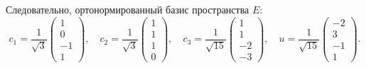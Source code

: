 Следовательно, ортонормированный базис пространства $E$:
{\hfuzz=5pt
\[
c_1=\frac1{\sqrt3}
\begin{pmatrix}
1\\
0\\
-1\\
1
\end{pmatrix},
\quad
c_2=\frac1{\sqrt3}
\begin{pmatrix}
1\\
1\\
1\\
0
\end{pmatrix},
\quad
c_3=\frac1{\sqrt{15}}
\begin{pmatrix}
1\\
1\\
-2\\
-3
\end{pmatrix},
\quad
u=\frac1{\sqrt{15}}
\begin{pmatrix}
-2\\
3\\
-1\\
1
\end{pmatrix}.
\]
}
